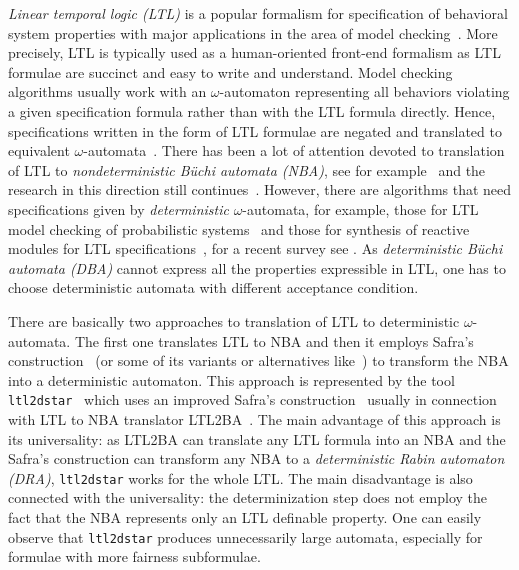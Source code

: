 \documentclass{llncs}
\begin{document}
\emph{Linear temporal logic (LTL)} is a popular formalism for specification
of behavioral system properties with major applications in the area of model
checking~\cite{CGP99,BK08}. More precisely, LTL is typically used as a
human-oriented front-end formalism as LTL formulae are succinct and easy to
write and understand. Model checking algorithms usually work with an
$\omega$-automaton representing all behaviors violating a given
specification formula rather than with the LTL formula directly. Hence,
specifications written in the form of LTL formulae are negated and
translated to equivalent $\omega$-automata~\cite{VardiW86}. There has been a
lot of attention devoted to translation of LTL to \emph{nondeterministic
  B\"uchi automata (NBA)}, see for example~\cite{Cou99,DGV99,SB00,GO01} and
the research in this direction still continues~\cite{DL11,BKRS12,BBDL13}.  However,
there are algorithms that need specifications given by \emph{deterministic}
$\omega$-automata, for example, those for LTL model checking of
probabilistic systems~\cite{Vardi85,CY95,BK08} and those for synthesis of
reactive modules for LTL specifications~\cite{Church62,PnueliR89}, for a
recent survey see \cite{Kupferman12}.
As \emph{deterministic B\"uchi automata (DBA)} cannot express all the
properties expressible in LTL, one has to choose deterministic automata with
different acceptance condition.


There are basically two approaches to translation of LTL to
deterministic $\omega$-automata. The first one translates LTL to NBA
and then it employs Safra's construction~\cite{Saf88} (or some of its
variants or alternatives like~\cite{Pit07,Sch09}) to transform the NBA into
a deterministic automaton. This approach is represented by the
tool \texttt{ltl2dstar}~\cite{Kle} which uses an improved Safra's
construction~\cite{KB06,KB07} usually in connection with LTL to NBA
translator LTL2BA~\cite{GO01}. The main advantage of this approach is its
universality: as LTL2BA can translate any LTL formula into an NBA and the
Safra's construction can transform any NBA to a \emph{deterministic Rabin
  automaton (DRA)}, \texttt{ltl2dstar} works for the whole LTL. The main
disadvantage is also connected with the universality: the determinization
step does not employ the fact that the NBA represents only an LTL definable
property. One can easily observe that \texttt{ltl2dstar} produces
unnecessarily large automata, especially for formulae with more fairness
subformulae.
\end{document}
